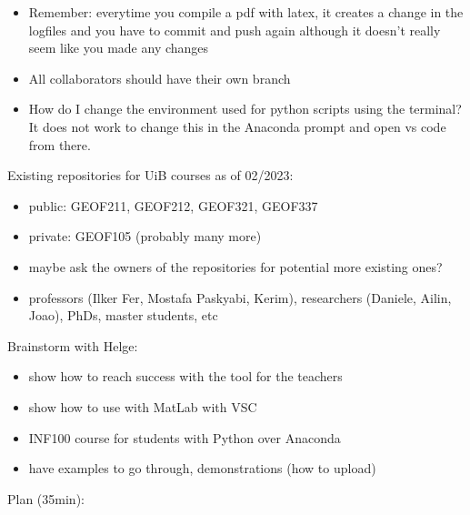 \documentclass{article}
\begin{document}
    \begin{itemize}
        \item Remember: everytime you compile a pdf with latex, it creates a 
        change in the logfiles and you have to commit and push again although 
        it doesn't really seem like you made any changes
        \item All collaborators should have their own branch
        \item How do I change the environment used for python scripts using 
        the terminal? It does not work to change this in the Anaconda prompt 
        and open vs code from there. 
    \end{itemize}

Existing repositories for UiB courses as of 02/2023:
\begin{itemize}
    \item public: GEOF211, GEOF212, GEOF321, GEOF337
    \item private: GEOF105 (probably many more)
    \item maybe ask the owners of the repositories for potential more existing ones?
    \item professors (Ilker Fer, Mostafa Paskyabi, Kerim), researchers (Daniele, Ailin, Joao), PhDs, master students, etc
\end{itemize}

Brainstorm with Helge:
\begin{itemize}
    \item show how to reach success with the tool for the teachers
    \item show how to use with MatLab with VSC
    \item INF100 course for students with Python over Anaconda
    \item have examples to go through, demonstrations (how to upload)
\end{itemize}

\pagebreak

Plan (35min):
\end{document}
